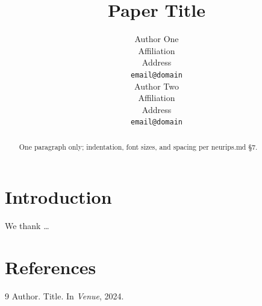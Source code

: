 \documentclass{article}
\title{Paper Title}
\author{%
  Author One \\
  Affiliation \\
  Address \\
  \texttt{email@domain} \\
  \And
  Author Two \\
  Affiliation \\
  Address \\
  \texttt{email@domain} \\
}
\begin{document}
\maketitle

\begin{abstract}
  One paragraph only; indentation, font sizes, and spacing per neurips.md \S7.
\end{abstract}

\section{Introduction}


\clearpage

\begin{ack}
We thank \ldots
\end{ack}

\section*{References}
{
\small
\begin{thebibliography}{9}
  Author.
  \newblock Title.
  \newblock In \emph{Venue}, 2024.
\end{thebibliography}
}

\newpage

\end{document}
